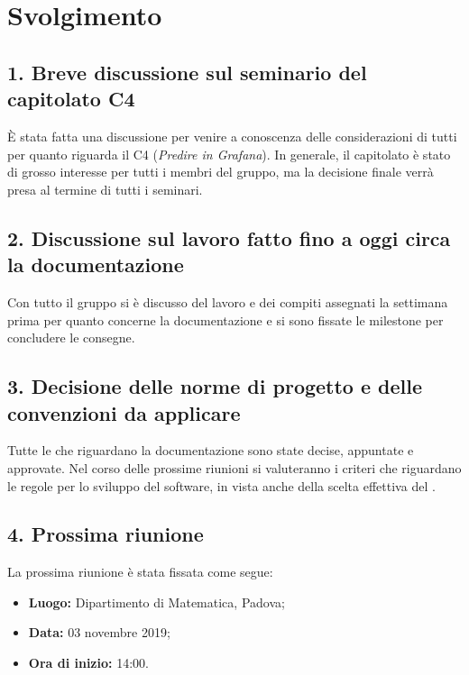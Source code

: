 \newpage
\section*{Svolgimento}

\subsection*{1. Breve discussione sul seminario del capitolato C4 }

È stata fatta una discussione per venire a conoscenza delle considerazioni di tutti per quanto riguarda il  C4 (\textit{Predire in Grafana}). In generale, il capitolato è stato di grosso interesse per tutti i membri del gruppo, ma la decisione finale verrà presa al termine di tutti i seminari.

\subsection*{2. Discussione sul lavoro fatto fino a oggi circa la documentazione}

Con tutto il gruppo si è discusso del lavoro e dei compiti assegnati la settimana prima per quanto concerne la documentazione e si sono fissate le milestone per concludere le consegne.

\subsection*{3. Decisione delle norme di progetto e delle convenzioni da applicare}

Tutte le  che riguardano la documentazione sono state decise, appuntate e approvate. Nel corso delle prossime riunioni si valuteranno i criteri che riguardano le regole per lo sviluppo del software, in vista anche della scelta effettiva del .

\subsection*{4. Prossima riunione}

La prossima riunione è stata fissata come segue:
\begin{itemize}
	\item \textbf{Luogo:} Dipartimento di Matematica, Padova;
	\item \textbf{Data:} 03 novembre 2019;
	\item \textbf{Ora di inizio:} 14:00.
\end{itemize}
